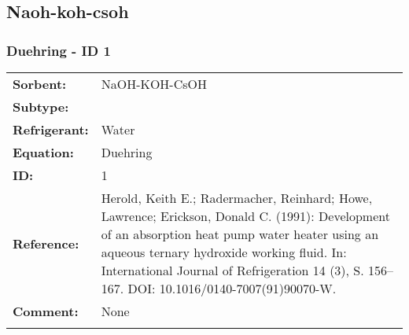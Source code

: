 \subsection{Naoh-koh-csoh }
%
\subsubsection{Duehring - ID 1}
%
\begin{tabular}[l]{|lp{11.5cm}|}
\hline
\addlinespace

\textbf{Sorbent:} & NaOH-KOH-CsOH \\
\textbf{Subtype:} &  \\
\textbf{Refrigerant:} & Water \\
\textbf{Equation:} & Duehring \\
\textbf{ID:} & 1 \\
\textbf{Reference:} & Herold, Keith E.; Radermacher, Reinhard; Howe, Lawrence; Erickson, Donald C. (1991): Development of an absorption heat pump water heater using an aqueous ternary hydroxide working fluid. In: International Journal of Refrigeration 14 (3), S. 156–167. DOI: 10.1016/0140-7007(91)90070-W. \\
\textbf{Comment:} & None \\

\addlinespace
\hline
\end{tabular}
\newline

